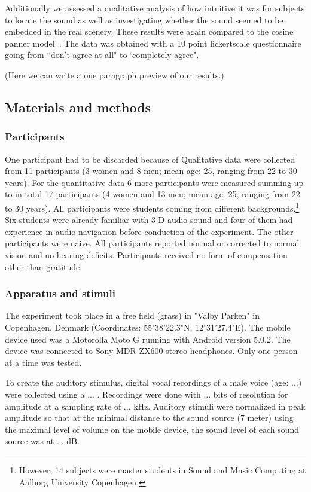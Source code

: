 \documentclass[journal]{IEEEtran}
\begin{document}
Additionally we assessed a qualitative analysis of how intuitive it was for subjects to locate the sound as well as investigating whether the sound seemed to be embedded in the real scenery. These results were again compared to the cosine panner model~\cite{AndyFarnell2010}. The data was obtained with a 10 point lickertscale questionnaire going from ``don't agree at all" to `completely agree".

(Here we can write a one paragraph preview of our results.)
\subsection{Materials and methods}
\subsubsection{Participants}
One participant had to be discarded because of 
Qualitative data were collected from 11 participants (3 women and 8 men; mean age: 25, ranging from 22 to 30 years). For the quantitative data 6 more participants were measured summing up to in total 17 participants (4 women and 13 men; mean age: 25, ranging from 22 to 30 years). All participants were students coming from different backgrounds.\footnote{However, 14 subjects were master students in Sound and Music Computing at Aalborg University Copenhagen.} Six students were already familiar with 3-D audio sound and four of them had experience in audio navigation before conduction of the experiment. The other participants were naive. All participants reported normal or corrected to normal vision and no hearing deficits. Participants received no form of compensation other than gratitude. 

\subsubsection{Apparatus and stimuli}
The experiment took place in a free field (grass) in "Valby Parken" in Copenhagen, Denmark (Coordinates: 55$^\circ$38'22.3"N, 12$^\circ$31'27.4"E). The mobile device used was a Motorolla Moto G running with Android version 5.0.2. The device was connected to Sony MDR ZX600 stereo headphones. Only one person at a time was tested. 

To create the auditory stimulus, digital vocal recordings of a male voice (age: ...) were collected using a ... . Recordings were done with ... bits of resolution for amplitude at a sampling rate of ...  kHz. Auditory stimuli were normalized in peak amplitude so that at the minimal distance to the sound source (7 meter) using the maximal level of volume on the mobile device, the sound level of each sound source was at ... dB. 
\end{document}
